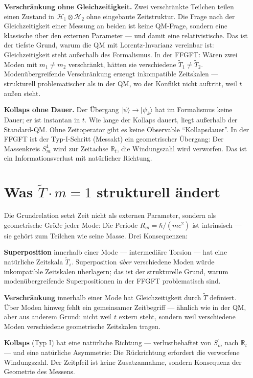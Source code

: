 \textbf{Verschränkung ohne Gleichzeitigkeit.} Zwei verschränkte
Teilchen teilen einen Zustand in $\mathcal{H}_1\otimes\mathcal{H}_2$
ohne eingebaute Zeitstruktur. Die Frage nach der Gleichzeitigkeit
einer Messung an beiden ist keine QM-Frage, sondern eine klassische
über den externen Parameter --- und damit eine relativistische. Das ist
der tiefste Grund, warum die QM mit Lorentz-Invarianz vereinbar ist:
Gleichzeitigkeit steht außerhalb des Formalismus. In der FFGFT: Wären
zwei Moden mit $m_1\neq m_2$ verschränkt, hätten sie verschiedene
$\tilde T_1\neq\tilde T_2$. Modenübergreifende Verschränkung erzeugt
inkompatible Zeitskalen --- strukturell problematischer als in der QM,
wo der Konflikt nicht auftritt, weil $t$ außen steht.

\textbf{Kollaps ohne Dauer.} Der Übergang $|\psi\rangle\to|\psi_k\rangle$
hat im Formalismus keine Dauer; er ist instantan in $t$. Wie lange der
Kollaps dauert, liegt außerhalb der Standard-QM. Ohne Zeitoperator gibt
es keine Observable \enquote{Kollapsdauer}. In der FFGFT ist der
Typ-I-Schritt (Messakt) ein geometrischer Übergang: Der Massenkreis
$S^1_m$ wird zur Zeitachse $\mathbb{R}_t$, die Windungszahl wird
verworfen. Das ist ein Informationsverlust mit natürlicher Richtung.

\section{Was $\tilde T\cdot m = 1$ strukturell ändert}

Die Grundrelation setzt Zeit nicht als externen Parameter, sondern als
geometrische Größe jeder Mode: Die Periode $R_m = \hbar/(mc^2)$ ist
intrinsisch --- sie gehört zum Teilchen wie seine Masse. Drei
Konsequenzen:

\textbf{Superposition} innerhalb einer Mode --- intermediäre Torsion
--- hat eine natürliche Zeitskala $\tilde T_i$. Superposition
\emph{über} verschiedene Moden würde inkompatible Zeitskalen
überlagern; das ist der strukturelle Grund, warum modenübergreifende
Superpositionen in der FFGFT problematisch sind.

\textbf{Verschränkung} innerhalb einer Mode hat Gleichzeitigkeit durch
$\tilde T$ definiert. Über Moden hinweg fehlt ein gemeinsamer
Zeitbegriff --- ähnlich wie in der QM, aber aus anderem Grund: nicht
weil $t$ extern steht, sondern weil verschiedene Moden verschiedene
geometrische Zeitskalen tragen.

\textbf{Kollaps} (Typ I) hat eine natürliche Richtung ---
verlustbehaftet von $S^1_m$ nach $\mathbb{R}_t$ --- und eine natürliche
Asymmetrie: Die Rückrichtung erfordert die verworfene Windungszahl. Der
Zeitpfeil ist keine Zusatzannahme, sondern Konsequenz der Geometrie des
Messens.


